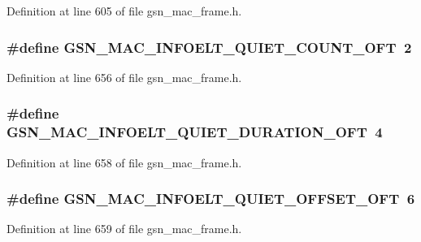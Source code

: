 Definition at line 605 of file gsn\_\-mac\_\-frame.h.

\hypertarget{a00523_a9aa658f0d23aafdb605c4b85dd587041}{
\subsubsection[{GSN\_\-MAC\_\-INFOELT\_\-QUIET\_\-COUNT\_\-OFT}]{\setlength{\rightskip}{0pt plus 5cm}\#define GSN\_\-MAC\_\-INFOELT\_\-QUIET\_\-COUNT\_\-OFT~2}}
\label{a00523_a9aa658f0d23aafdb605c4b85dd587041}


Definition at line 656 of file gsn\_\-mac\_\-frame.h.

\hypertarget{a00523_aba72612f641a456c210df6fcb2845c86}{
\subsubsection[{GSN\_\-MAC\_\-INFOELT\_\-QUIET\_\-DURATION\_\-OFT}]{\setlength{\rightskip}{0pt plus 5cm}\#define GSN\_\-MAC\_\-INFOELT\_\-QUIET\_\-DURATION\_\-OFT~4}}
\label{a00523_aba72612f641a456c210df6fcb2845c86}


Definition at line 658 of file gsn\_\-mac\_\-frame.h.

\hypertarget{a00523_a97154d3ebc3d3b16955261fcb8f2940f}{
\subsubsection[{GSN\_\-MAC\_\-INFOELT\_\-QUIET\_\-OFFSET\_\-OFT}]{\setlength{\rightskip}{0pt plus 5cm}\#define GSN\_\-MAC\_\-INFOELT\_\-QUIET\_\-OFFSET\_\-OFT~6}}
\label{a00523_a97154d3ebc3d3b16955261fcb8f2940f}


Definition at line 659 of file gsn\_\-mac\_\-frame.h.

